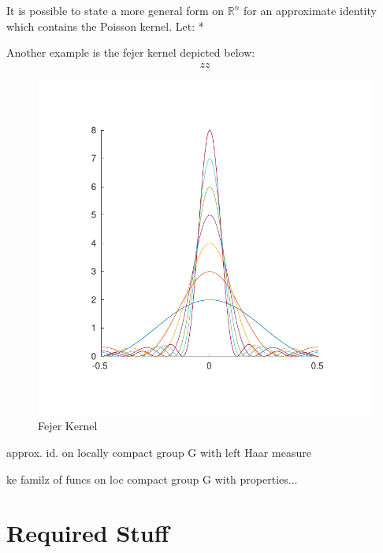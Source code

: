 \begin{remark}
It is possible to state a more general form on $\mathbb{R}^n$ for an approximate identity which contains the Poisson kernel. Let: *
\end{remark}

\begin{example}
Another example is the fejer kernel depicted below:
\begin{align*}
zz
\end{align*}

\begin{figure}[h!bt]
\centering
\includegraphics[width = \textwidth]{matlab/fejerkernel}
\caption{Fejer Kernel}
\label{fejer}
\end{figure}
\end{example}

\begin{theorem}
approx. id. on locally compact group G with left Haar measure
\end{theorem}

\begin{theorem}
ke familz of funcs on loc compact group G with properties...
\end{theorem}

\section{Required Stuff}

